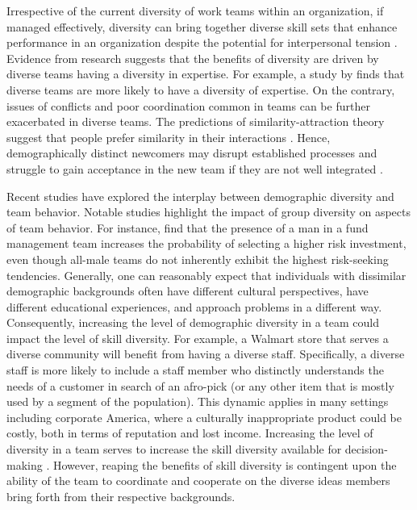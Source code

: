 \hspace *{0mm}Irrespective of the current diversity of work teams within an organization, if managed effectively, diversity can bring together diverse skill sets that enhance performance in an organization despite the potential for interpersonal tension \citep{rvhv13}. Evidence from research suggests that the benefits of diversity are driven by diverse teams having a diversity in expertise. For example, a study by \cite{ks16} finds that diverse teams are more likely to have a diversity of expertise. On the contrary, issues of conflicts and poor coordination common in teams can be further exacerbated in diverse teams. The predictions of similarity-attraction theory suggest that people prefer similarity in their interactions \citep{b71,bw62}. Hence, demographically distinct newcomers may disrupt established processes and struggle to gain acceptance in the new team if they are not well integrated \citep{c05,rkev13}.

\hspace *{0mm} Recent studies have explored the interplay between demographic diversity and team behavior. Notable studies highlight the impact of group diversity on aspects of team behavior. For instance, \cite{bjd13} find that the presence of a man in a fund management team increases the probability of selecting a higher risk investment, even though all-male teams do not inherently exhibit the highest risk-seeking tendencies. Generally, one can reasonably expect that individuals with dissimilar demographic backgrounds often have different cultural perspectives, have different educational experiences, and approach problems in a different way. Consequently, increasing the level of demographic diversity in a team could impact the level of skill diversity. For example, a Walmart store that serves a diverse community will benefit from having a diverse staff. Specifically, a diverse staff is more likely to include a staff member who distinctly understands the needs of a customer in search of an afro-pick (or any other item that is mostly used by a segment of the population). This dynamic applies in many settings including corporate America, where a culturally inappropriate product could be costly, both in terms of reputation and lost income.  Increasing the level of diversity in a team serves to increase the skill diversity available for decision-making \citep{jnn99}. However, reaping the benefits of skill diversity is contingent upon the ability of the team to coordinate and cooperate on the diverse ideas members bring forth from their respective backgrounds.

